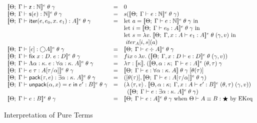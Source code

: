 \begin{figure}
\begin{displaymath}
\begin{array}{lcl}
    \interpE{\judgeE{\Gamma}{\z}{\N}}\;\theta\;\gamma
       & = & 
         0 
    \\
    \interpE{\judgeE{\Gamma}{\s{e}}{\N}}\;\theta\;\gamma
       & = & 
         s (\interpE{\judgeE{\Gamma}{e}{\N}}\;\theta\;\gamma)
    \\
    \interpE{\judgeE{\Gamma}{\iter{e}{e_0}{x}{e_1}}{A}}\;\theta\;\gamma
    &=& 
       \mbox{let } 
          a = \interpE{\judgeE{\Gamma}{e}{\N}}\;\theta\;\gamma  
       \mbox{ in}\\
    & &\mbox{let } 
          i = \interpE{\judgeE{\Gamma}{e_0}{A}}\;\theta\;\gamma
       \mbox{ in}\\
    & &\mbox{let } 
          s = \semfun{v}{\interpE{\judgeE{\Gamma,x:A}{e_1}{A}}\;\theta\;(\gamma,v)}  
       \mbox{ in}\\
    & &\mbox{ }iter_A[i, s](a)
   \\
   \interpE{\judgeE{\Gamma}{\comp{c}}{\monad{A}}}\;\theta\;\gamma
   & = & 
     \interpC{\judgeC{\Gamma}{c}{A}}\;\theta\;\gamma
   \\
   \interpE{\judgeE{\Gamma}{\fix{x:D}{e}}{D}}\;\theta\;\gamma
   & = & 
     fix \circ \semfun{v}{(\interpE{\judgeE{\Gamma, x:D}{e}{D}}\;\theta\;(\gamma,v))}
   \\
   \interpE{\judgeE{\Gamma}{\Fun{\alpha}{\kappa}{e}}
                           {\forall \alpha:\kappa.\; A}}\;\theta\;\gamma 
   & = & 
     \lambda \tau:\interp{\kappa}.\; 
        (\interpE{\judgeE[\Theta, \alpha:\kappa]{\Gamma}{e}{A}}\;(\theta, \tau)\;\gamma
   \\
   \interpE{\judgeE{\Gamma}{e\;\tau}{A[\tau/\alpha]}}\;\theta\;\gamma
   & = & 
     \interp{\judgeE{\Gamma}{e}{\forall \alpha:\kappa.\;A}}\;\theta\;\gamma\;
            [\theta(\tau)]
   \\
   \interpE{\judgeE{\Gamma}{\pack{\tau}{e}}{\exists \alpha:\kappa.\;A}}
           \;\theta\;\gamma
   & = & 
     ([\theta(\tau)], \interpE{\judgeE{\Gamma}{e}{A[\tau/\alpha]}}\;\theta\;\gamma)
   \\
   \interpE{\judgeE{\Gamma}{\unpack{\alpha}{x}{e}{e'}}{B}}\;\theta\;\gamma
   & = & 
   (\semfun{\pair{\tau}{v}}
           {\interpE{\judgeE[\Theta, \alpha:\kappa]{\Gamma, x:A}{e'}{B}}
                    \;(\theta, \tau)\;(\gamma,v)})
   \\
   & & \;\;
   (\interpE{\judgeE{\Gamma}{e}{\exists \alpha:\kappa.\;A}}\;\theta\;\gamma)
   \\
   \interpE{\judgeE{\Gamma}{e}{B}}\;\theta\;\gamma 
   & = & 
     \interpE{\judgeE{\Gamma}{e}{A}}\;\theta\;\gamma \mbox{ when } \judgeKeq{A}{B}{\bigstar}
     \mbox{ by EKeq}
   \\
  \end{array}
\end{displaymath}
\caption{Interpretation of Pure Terms}
\label{lang-pure-interp}
\end{figure}

